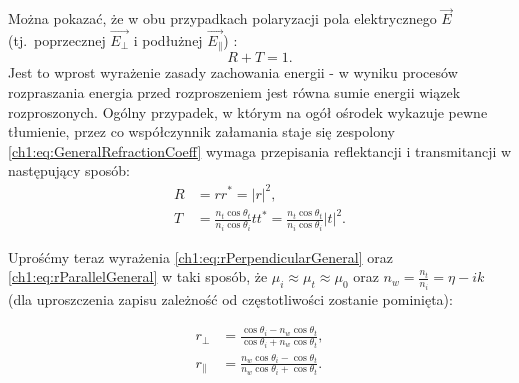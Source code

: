 Można pokazać, że w obu przypadkach polaryzacji pola elektrycznego $\vec{E}$ (tj.~poprzecznej $\vec{E_\perp}$ i podłużnej $\vec{E_\parallel}$) :
\begin{equation}
R + T = 1.
\end{equation}
Jest to wprost wyrażenie zasady zachowania energii - w wyniku procesów rozpraszania energia przed rozproszeniem jest równa sumie energii wiązek rozproszonych.
Ogólny przypadek, w którym na ogół ośrodek wykazuje pewne tłumienie, przez co współczynnik załamania staje się zespolony \eqref{ch1:eq:GeneralRefractionCoeff} wymaga przepisania reflektancji i transmitancji w następujący sposób:
\begin{align}
\label{ch1:eq:ReflectanceGeneral}
R &= rr^* = |r|^2,\\
\label{ch1:eq:TransmitanceGeneral}
T &= \frac{n_t\cos\theta_t}{n_i\cos\theta_i}tt^* = \frac{n_t\cos\theta_t}{n_i\cos\theta_i}|t|^2.
\end{align}

Uprośćmy teraz wyrażenia \eqref{ch1:eq:rPerpendicularGeneral} oraz \eqref{ch1:eq:rParallelGeneral} w taki sposób, że $\mu_i \approx \mu_t \approx \mu_0$ oraz $n_w = \frac{n_t}{n_i}=\eta - ik$ (dla uproszczenia zapisu zależność od częstotliwości zostanie pominięta):

\begin{align}
r_\perp &= \frac{\cos\theta_i - n_w\cos\theta_t}{\cos\theta_i + n_w\cos\theta_t},\\
r_\parallel &= \frac{n_w\cos\theta_i - \cos\theta_t}{n_w\cos\theta_i + \cos\theta_t}.
\end{align}

